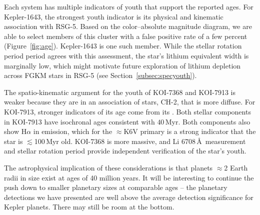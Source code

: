 \documentclass[12pt,twocolumn,tighten,linenumbers]{aastex63}
\begin{document}
Each system has multiple indicators of youth that support the reported
ages.  For Kepler-1643, the strongest youth indicator is its physical
and kinematic association with RSG-5.  Based on the color--absolute
magnitude diagram, we are able to select members of this cluster with
a false positive rate of a few percent (Figure~\ref{fig:age}).
Kepler-1643 is one such member.  While the stellar rotation period
period agrees with this assessment, the star's lithium equivalent
width is marginally low, which might motivate future exploration of
lithium depletion across FGKM stars in RSG-5 (see
Section~\ref{subsec:specyouth}).

The spatio-kinematic argument for the youth of KOI-7368 and KOI-7913
is weaker because they are in an association of stars, CH-2, that is
more diffuse.  For KOI-7913, stronger indicators of its age come from
its .  Both stellar components in KOI-7913 have isochronal ages
consistent with $40$\,Myr.  Both components also show H$\alpha$ in
emission, which for the  $\approx$K6V primary is a strong indicator
that the star is $\lesssim$100$\,$Myr old.  KOI-7368 is  more
massive, and  Li 6708\,\AA\ measurement and stellar rotation period
provide independent verification of the star's youth.

The astrophysical implication of these considerations is that planets
$\approx$2 Earth radii in size exist at ages of 40 million years.  It
will be interesting to continue the push down to smaller planetary
sizes at comparable ages -- the planetary detections we have presented
are well above the average detection significance for Kepler planets.
There may still be room at the bottom.



\end{document}
